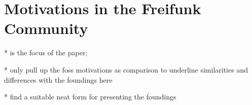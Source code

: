 \section{Motivations in the Freifunk Community}

* is the focus of the paper;

* only pull up the foss motivations as comparison to underline similarities and differences with the foundings here

* find a suitable neat form for presenting the foundings
